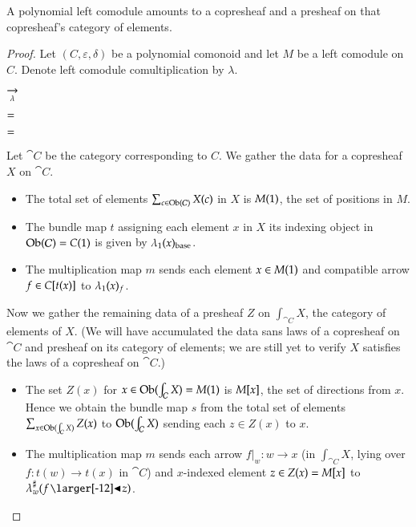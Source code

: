 \documentclass{amsart}
\begin{document}
\begin{prop}
  A polynomial left comodule amounts to a copresheaf and a presheaf on that
  copresheaf's category of elements.
\end{prop}
\begin{proof}
  Let $(C, \varepsilon, \delta)$ be a polynomial comonoid and let $M$ be a left comodule on
  $C$. Denote left comodule
  comultiplication by $\lambda$.

  \begin{center}
    
    \hspace{-.75em}
    $\underset{\lambda}{\to}$
    \hspace{.5em}
    
  \end{center}

  \begin{center}
    
    \quad
    $=$
    
  \end{center}
  
  \begin{center}
    
    \quad
    $=$
    \quad
    
  \end{center}

  Let $\cat{C}$ be the category corresponding to $C$. We gather the
  data for a copresheaf $X$ on $\cat{C}$.
  \begin{itemize}
  \item The total set of elements $\sum_{c \in \operatorname{Ob}(\mathcal{C})}X(c)$ in
    $X$ is $M(1)$, the set of positions in $M$.
  \item The bundle map $t$ assigning each element $x$ in $X$ its indexing
    object in $\operatorname{Ob}(\mathcal{C}) = C(1)$ is given by ${\lambda}_1(x)_{\mathrm{base}}$.
  \item The multiplication map $m$ sends each element $x \in M(1)$
    and compatible arrow $f \in C[t(x)]$ to
    ${\lambda}_1(x)_f$.
  \end{itemize}

  Now we gather the remaining data of a presheaf $Z$ on
  $\int_{\cat{C}}X$, the category of elements of $X$. (We will have
  accumulated the data sans laws of a copresheaf on $\cat{C}$ and
  presheaf on its category of elements; we are still yet to
  verify $X$ satisfies the laws of a copresheaf on $\cat{C}$.)
  \begin{itemize}
  \item The set $Z(x)$ for $x \in \operatorname{Ob}(\int_{\mathcal{C}}X) = M(1)$ is
    $M[x]$, the set of directions from $x$. Hence we obtain the
    bundle map $s$ from the total set of elements
    $\sum_{x \in \operatorname{Ob}(\int_{\mathcal{C}}X)}Z(x)$ to $\operatorname{Ob}(\int_{\mathcal{C}}X)$
    sending each $z \in Z(x)$ to $x$.
  \item The multiplication map $m$ sends each arrow $f|_w: w \to x$
    (in $\int_{\cat{C}}X$, lying over $f: t(w) \to t(x)$ in $\cat{C}$)
    and $x$-indexed element $z \in Z(x) = M[x]$ to
    $\dirmap{\lambda}{w}{f \subd z}$.


\end{itemize}
\end{proof}
\end{document}
